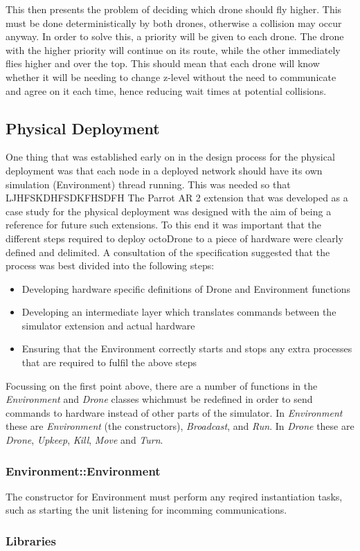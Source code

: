 This then presents the problem of deciding which drone should fly higher. This must be done deterministically by both drones, otherwise a collision may occur anyway. In order to solve this, a priority will be given to each drone. The drone with the higher priority will continue on its route, while the other immediately flies higher and over the top. This should mean that each drone will know whether it will be needing to change z-level without the need to communicate and agree on it each time, hence reducing wait times at potential collisions.

\subsection{Physical Deployment}
One thing that was established early on in the design process for the physical deployment was that each node in a deployed network should have its own simulation (Environment) thread running. This was needed so that LJHFSKDHFSDKFHSDFH The Parrot AR 2 extension that was developed as a case study for the physical deployment was designed with the aim of being a reference for future such extensions. To this end it was important that the different steps required to deploy octoDrone to a piece of hardware were clearly defined and delimited. A consultation of the specification suggested that the process was best divided into the following steps:

\begin{itemize}
\item Developing hardware specific definitions of Drone and Environment functions
\item Developing an intermediate layer which translates commands between the simulator extension and actual hardware
\item Ensuring that the Environment correctly starts and stops any extra processes that are required to fulfil the above steps
\end{itemize}

Focussing on the first point above, there are a number of functions in the \textit{Environment} and \textit{Drone} classes whichmust be redefined in order to send commands to hardware instead of other parts of the simulator. In \textit{Environment} these are \textit{Environment} (the constructors), \textit{Broadcast}, and \textit{Run}. In \textit{Drone} these are \textit{Drone}, \textit{Upkeep}, \textit{Kill}, \textit{Move} and \textit{Turn}.

\subsubsection{Environment::Environment}
The constructor for Environment must perform any reqired instantiation tasks, such as starting the unit listening for incomming communications.

\subsubsection{Libraries}
